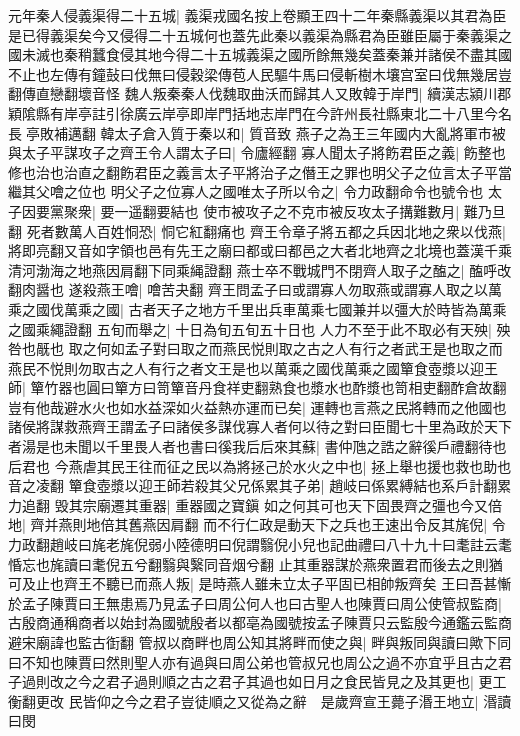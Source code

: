 元年秦人侵義渠得二十五城|{
	義渠戎國名按上卷顯王四十二年秦縣義渠以其君為臣是已得義渠矣今又侵得二十五城何也蓋先此秦以義渠為縣君為臣雖臣屬于秦義渠之國未滅也秦稍蠶食侵其地今得二十五城義渠之國所餘無幾矣蓋秦兼并諸侯不盡其國不止也左傳有鐘鼔曰伐無曰侵穀梁傳苞人民驅牛馬曰侵斬樹木壤宫室曰伐無幾居豈翻傳直戀翻壞音怪
	}
魏人叛秦秦人伐魏取曲沃而歸其人又敗韓于岸門|{
	續漢志潁川郡穎隂縣有岸亭註引徐廣云岸亭即岸門括地志岸門在今許州長社縣東北二十八里今名長亭敗補邁翻
	}
韓太子倉入質于秦以和|{
	質音致
	}
燕子之為王三年國内大亂將軍市被與太子平謀攻子之齊王令人謂太子曰|{
	令廬經翻
	}
寡人聞太子將飭君臣之義|{
	飭整也修也治也治直之翻飭君臣之義言太子平將治子之僭王之罪也明父子之位言太子平當繼其父噲之位也
	}
明父子之位寡人之國唯太子所以令之|{
	令力政翻命令也號令也
	}
太子因要黨聚衆|{
	要一遥翻要結也
	}
使市被攻子之不克市被反攻太子搆難數月|{
	難乃旦翻
	}
死者數萬人百姓恫恐|{
	恫它紅翻痛也
	}
齊王令章子將五都之兵因北地之衆以伐燕|{
	將即亮翻又音如字領也邑有先王之廟曰都或曰都邑之大者北地齊之北境也蓋漢千乘清河渤海之地燕因肩翻下同乘䋲證翻
	}
燕士卒不戰城門不閉齊人取子之醢之|{
	醢呼改翻肉醤也
	}
遂殺燕王噲|{
	噲苦夬翻
	}
齊王問孟子曰或謂寡人勿取燕或謂寡人取之以萬乘之國伐萬乘之國|{
	古者天子之地方千里出兵車萬乘七國兼并以彊大於時皆為萬乘之國乘繩證翻
	}
五旬而舉之|{
	十日為旬五旬五十日也
	}
人力不至于此不取必有天殃|{
	殃咎也旤也
	}
取之何如孟子對曰取之而燕民悦則取之古之人有行之者武王是也取之而燕民不悦則勿取古之人有行之者文王是也以萬乘之國伐萬乘之國簞食壺漿以迎王師|{
	簞竹器也圓曰簞方曰笥簞音丹食祥吏翻熟食也漿水也酢漿也笥相吏翻酢倉故翻
	}
豈有他哉避水火也如水益深如火益熱亦運而已矣|{
	運轉也言燕之民將轉而之他國也
	}
諸侯將謀救燕齊王謂孟子曰諸侯多謀伐寡人者何以待之對曰臣聞七十里為政於天下者湯是也未聞以千里畏人者也書曰徯我后后來其蘇|{
	書仲虺之誥之辭徯戶禮翻待也后君也
	}
今燕虐其民王往而征之民以為將拯己於水火之中也|{
	拯上舉也援也救也助也音之凌翻
	}
簞食壺漿以迎王師若殺其父兄係累其子弟|{
	趙岐曰係累縛結也系戶計翻累力追翻
	}
毁其宗廟遷其重器|{
	重器國之寶鎭
	}
如之何其可也天下固畏齊之彊也今又倍地|{
	齊并燕則地倍其舊燕因肩翻
	}
而不行仁政是動天下之兵也王速出令反其旄倪|{
	令力政翻趙岐曰旄老旄倪弱小陸德明曰倪謂翳倪小兒也記曲禮曰八十九十曰耄註云耄惛忘也旄讀曰耄倪五兮翻翳與繄同音烟兮翻
	}
止其重器謀於燕衆置君而後去之則猶可及止也齊王不聽已而燕人叛|{
	是時燕人雖未立太子平固已相帥叛齊矣
	}
王曰吾甚慚於孟子陳賈曰王無患焉乃見孟子曰周公何人也曰古聖人也陳賈曰周公使管叔監商|{
	古殷商通稱商者以始封為國號殷者以都亳為國號按孟子陳賈只云監殷今通鑑云監商避宋廟諱也監古衘翻
	}
管叔以商畔也周公知其將畔而使之與|{
	畔與叛同與讀曰歟下同
	}
曰不知也陳賈曰然則聖人亦有過與曰周公弟也管叔兄也周公之過不亦宜乎且古之君子過則改之今之君子過則順之古之君子其過也如日月之食民皆見之及其更也|{
	更工衡翻更改
	}
民皆仰之今之君子豈徒順之又從為之辭　是歲齊宣王薨子湣王地立|{
	湣讀曰閔
	}


